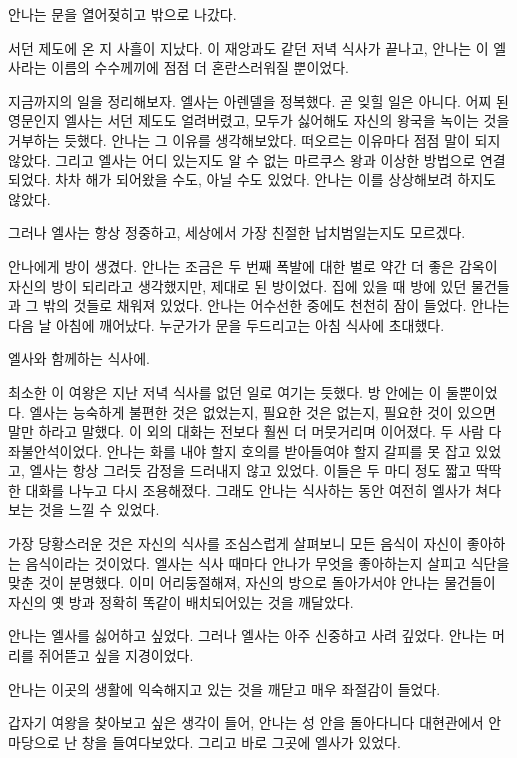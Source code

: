 안나는 문을 열어젖히고 밖으로 나갔다.

\textbreak

서던 제도에 온 지 사흘이 지났다. 이 재앙과도 같던 저녁 식사가 끝나고, 안나는 이 엘사라는 이름의 수수께끼에 점점 더 혼란스러워질 뿐이었다.

지금까지의 일을 정리해보자. 엘사는 아렌델을 정복했다. 곧 잊힐 일은 아니다. 어찌 된 영문인지 엘사는 서던 제도도 얼려버렸고, 모두가 싫어해도 자신의 왕국을 녹이는 것을 거부하는 듯했다. 안나는 그 이유를 생각해보았다. 떠오르는 이유마다 점점 말이 되지 않았다. 그리고 엘사는 어디 있는지도 알 수 없는 마르쿠스 왕과 이상한 방법으로 연결되었다. 차차 해가 되어왔을 수도, 아닐 수도 있었다. 안나는 이를 상상해보려 하지도 않았다.

그러나 엘사는 항상 정중하고, 세상에서 가장 친절한 납치범일는지도 모르겠다.

안나에게 방이 생겼다. 안나는 조금은 두 번째 폭발에 대한 벌로 약간 더 좋은 감옥이 자신의 방이 되리라고 생각했지만, 제대로 된 방이었다. 집에 있을 때 방에 있던 물건들과 그 밖의 것들로 채워져 있었다. 안나는 어수선한 중에도 천천히 잠이 들었다. 안나는 다음 날 아침에 깨어났다. 누군가가 문을 두드리고는 아침 식사에 초대했다.

엘사와 함께하는 식사에.

최소한 이 여왕은 지난 저녁 식사를 없던 일로 여기는 듯했다. 방 안에는 이 둘뿐이었다. 엘사는 능숙하게 불편한 것은 없었는지, 필요한 것은 없는지, 필요한 것이 있으면 말만 하라고 말했다. 이 외의 대화는 전보다 훨씬 더 머뭇거리며 이어졌다. 두 사람 다 좌불안석이었다. 안나는 화를 내야 할지 호의를 받아들여야 할지 갈피를 못 잡고 있었고, 엘사는 항상 그러듯 감정을 드러내지 않고 있었다. 이들은 두 마디 정도 짧고 딱딱한 대화를 나누고 다시 조용해졌다. 그래도 안나는 식사하는 동안 여전히 엘사가 쳐다보는 것을 느낄 수 있었다.

가장 당황스러운 것은 자신의 식사를 조심스럽게 살펴보니 모든 음식이 자신이 좋아하는 음식이라는 것이었다. 엘사는 식사 때마다 안나가 무엇을 좋아하는지 살피고 식단을 맞춘 것이 분명했다. 이미 어리둥절해져, 자신의 방으로 돌아가서야 안나는 물건들이 자신의 옛 방과 정확히 똑같이 배치되어있는 것을 깨달았다.

안나는 엘사를 싫어하고 싶었다. 그러나 엘사는 아주 신중하고 사려 깊었다. 안나는 머리를 쥐어뜯고 싶을 지경이었다.

안나는 이곳의 생활에 익숙해지고 있는 것을 깨닫고 매우 좌절감이 들었다.

갑자기 여왕을 찾아보고 싶은 생각이 들어, 안나는 성 안을 돌아다니다 대현관에서 안마당으로 난 창을 들여다보았다. 그리고 바로 그곳에 엘사가 있었다.

